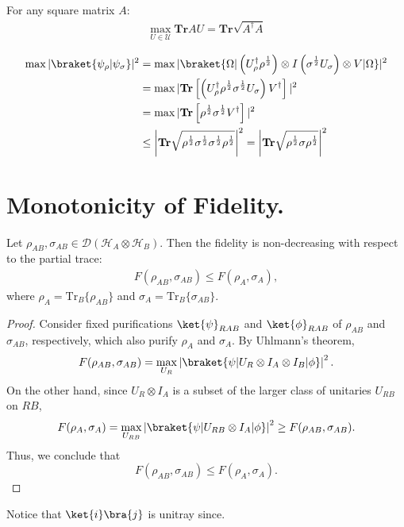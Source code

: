 \documentclass[12pt,a4paper]{article}
\begin{document}
\begin{claim} For any square matrix $A$:
  \begin{equation*}
    \begin{split}
      \max_{U \in \mathcal{U}} \mathbf{Tr} AU = \mathbf{Tr} \sqrt{ A^\dagger A } 
    \end{split}
  \end{equation*}
\end{claim}


\begin{equation*}
  \begin{split}
    \max | \braket{ \psi_\rho | \psi_\sigma } |^2  & = \max  | \braket{\Omega |   \left( U_{\rho}^{\dagger} \rho^{\frac{1}{2}}  \right) \otimes I   \left( \sigma^{\frac{1}{2}} U_{\sigma} \right) \otimes V     | \Omega}  |^{2} \\
  & = \max |     \mathbf{Tr} \left[  \left( U_{\rho}^{\dagger} \rho^{\frac{1}{2}}   \sigma^{\frac{1}{2}} U_{\sigma} \right)  V^\dagger\right]    |^{2} \\
  & = \max |     \mathbf{Tr} \left[  \rho^{\frac{1}{2}}   \sigma^{\frac{1}{2}}   V^\dagger\right]    |^{2} \\
  & \le \left|   \mathbf{Tr} \sqrt{      \rho^{\frac{1}{2}} \sigma^{\frac{1}{2}} \sigma^{\frac{1}{2}}\rho^{\frac{1}{2}}   }   \right|^{2} = \left|   \mathbf{Tr} \sqrt{      \rho^{\frac{1}{2}} \sigma \rho^{\frac{1}{2}}   }   \right|^{2}  \\
  \end{split}
\end{equation*}

\section{Monotonicity of Fidelity.}
Let $\rho_{AB}, \sigma_{AB} \in \mathcal{D}(\mathcal{H}_A \otimes \mathcal{H}_B)$. Then the fidelity is non-decreasing with respect to the partial trace:
\begin{equation*}
  \begin{split}
  F(\rho_{AB}, \sigma_{AB}) \leq F(\rho_A, \sigma_A),
  \end{split}
\end{equation*}
where $\rho_A = \mathrm{Tr}_B\{\rho_{AB}\}$ and $\sigma_A = \mathrm{Tr}_B\{\sigma_{AB}\}$.

\begin{proof}

Consider fixed purifications $\ket{\psi}_{RAB}$ and $\ket{\phi}_{RAB}$ of $\rho_{AB}$ and $\sigma_{AB}$, respectively, which also purify $\rho_A$ and $\sigma_A$. By Uhlmann’s theorem,
\[
F(\rho_{AB}, \sigma_{AB}) = \max_{U_R} \left| \braket{\psi | U_R \otimes I_A \otimes I_B | \phi} \right|^2.
\]
On the other hand, since $U_R \otimes I_A$ is a subset of the larger class of unitaries $U_{RB}$ on $RB$,
\[
F(\rho_A, \sigma_A) = \max_{U_{RB}} \left| \braket{\psi | U_{RB} \otimes I_A | \phi} \right|^2 \geq F(\rho_{AB}, \sigma_{AB}).
\]
Thus, we conclude that
\[
F(\rho_{AB}, \sigma_{AB}) \leq F(\rho_A, \sigma_A).
\]
\end{proof}
Notice that $\ket{i}\bra{j}$ is unitray since. 
\end{document}
